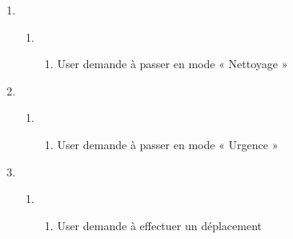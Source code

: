 {{\begin{minipage} {0.5\textwidth}
\begin{enumerate}[label=\arabic*.,ref=\arabic*]
\begin{enumerate}[label=\theenumi.\alph*.,ref=\theenumi\alph*]
                          \item {[mode « Urgence » activé]}
                                \begin{enumerate}[label=\theenumii.\arabic*.,ref=\theenumii\alph*]
                                    \item App affiche « Ecran\_Urgence »
                                    \item User demande à désactiver le mode « Urgence »
                                    \item Va en 5.a.1.
                                \end{enumerate}
                      \end{enumerate}
                \item \
                      \begin{enumerate}[label=\theenumi.\alph*.,ref=\theenumi\alph*]
                          \item \
                                \begin{enumerate}[label=\theenumii.\arabic*.,ref=\theenumii\alph*]
                                    \item User demande à passer en mode « Nettoyage »
                                \end{enumerate}
                      \end{enumerate}
                \item \
                      \begin{enumerate}[label=\theenumi.\alph*.,ref=\theenumi\alph*]
                          \item \
                                \begin{enumerate}[label=\theenumii.\arabic*.,ref=\theenumii\alph*]
                                    \item User demande à passer en mode « Urgence »
                                \end{enumerate}
                      \end{enumerate}
                \item \
                      \begin{enumerate}[label=\theenumi.\alph*.,ref=\theenumi\alph*]
                          \item \
                                \begin{enumerate}[label=\theenumii.\arabic*.,ref=\theenumii\alph*]
                                    \item User demande à effectuer un déplacement

\end{enumerate}
\end{enumerate}
\end{enumerate}
\end{minipage}}}
